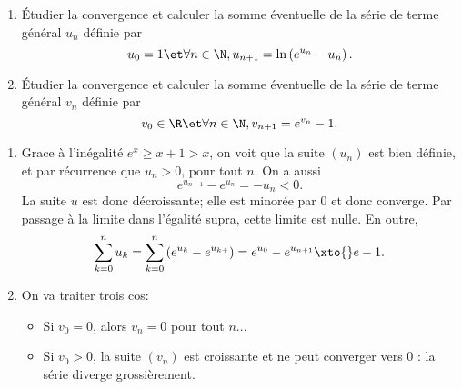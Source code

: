 \begin{enonce}
\begin{exercise}[ID={RMS133 E714},subtitle={Mines-Ponts PSI 2022},tags={},difficulty={}]
  \begin{enumerate}
    \item Étudier la convergence et calculer la somme éventuelle de la série de terme général $u_n$ définie par
      \begin{equation*}
        u_0 = 1 \et \forall n\in\N, u_{n+1} = \ln\left( e^{u_n} - u_n \right).
      \end{equation*}

    \item Étudier la convergence et calculer la somme éventuelle de la série de terme général $v_n$ définie par
      \begin{equation*}
        v_0 \in\R \et \forall n\in\N, v_{n+1} = e^{v_n} - 1.
      \end{equation*}
  \end{enumerate}
\end{exercise}
\begin{solution}
  \begin{enumerate}
    \item Grace à l'inégalité $e^x \geq x+1 > x$, on voit que la suite $(u_n)$ est bien définie, et par récurrence que $u_n > 0$, pour tout $n$.
      On a aussi
      \begin{equation*}
        e^{u_{n+1}} - e^{u_n} = -u_n < 0.
      \end{equation*}
      La suite $u$ est donc décroissante; elle est minorée par $0$ et donc converge.
      Par passage à la limite dans l'égalité supra, cette limite est nulle.
      En outre,
      \begin{equation*}
        \sum_{k=0}^{n} u_k 
        = \sum_{k=0}^{n} \left( e^{u_k} - e^{u_{k+}} \right) 
        = e^{u_0} - e^{u_{n+1}}
        \xto{} e - 1.
      \end{equation*}

      \item 
      On va traiter trois cos:
      \begin{itemize}
        \item Si $v_0=0$, alors $v_n = 0$ pour tout $n$...

        \item Si $v_0>0$, la suite $(v_n)$ est croissante et ne peut converger vers $0$ : la série diverge grossièrement.


\end{itemize}
\end{enumerate}
\end{solution}
\end{enonce}
